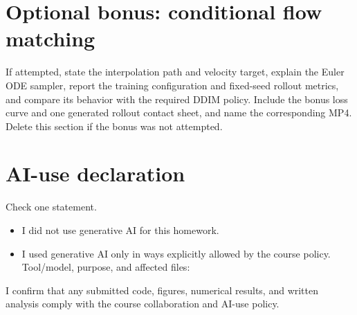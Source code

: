 \documentclass[11pt]{article}
\begin{document}

\section*{Optional bonus: conditional flow matching}
If attempted, state the interpolation path and velocity target, explain the
Euler ODE sampler, report the training configuration and fixed-seed rollout
metrics, and compare its behavior with the required DDIM policy. Include the
bonus loss curve and one generated rollout contact sheet, and name the
corresponding MP4. Delete this section if the bonus was not attempted.

\section*{AI-use declaration}
Check one statement.

\begin{itemize}
  \item[$\square$] I did not use generative AI for this homework.
  \item[$\square$] I used generative AI only in ways explicitly allowed by the
  course policy. Tool/model, purpose, and affected files:
  \underline{\hspace{1.6in}}
\end{itemize}

I confirm that any submitted code, figures, numerical results, and written
analysis comply with the course collaboration and AI-use policy.
\end{document}
